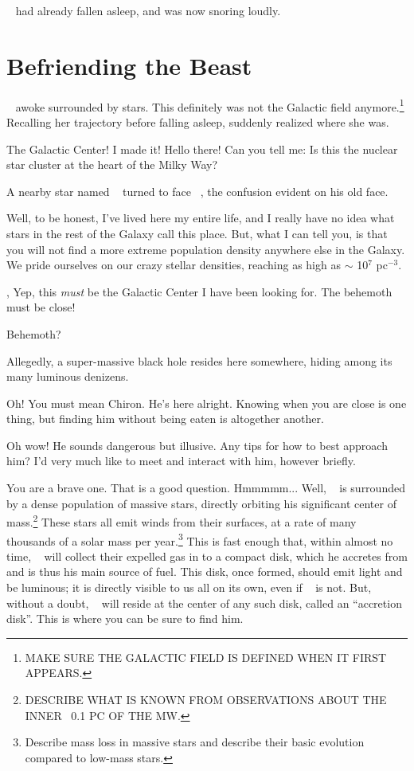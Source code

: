 \documentclass[main.tex]{subfiles}
\begin{document}
\newpara \rmelectra~ had already fallen asleep, and was now snoring loudly.

\section{Befriending the Beast} \label{beast}

\newpara \nar \rmelectra~ awoke surrounded by stars.  This definitely was not the Galactic field anymore.\footnote{MAKE SURE THE GALACTIC FIELD IS DEFINED WHEN IT FIRST APPEARS.}  Recalling her trajectory before falling asleep, \rmelectra suddenly realized where she was.

\newpara \Electra The Galactic Center!  I made it!  Hello there!  Can you tell me:  Is this the nuclear star cluster at the heart of the Milky Way?

\newpara \nar A nearby star named \rmcarystus~ turned to face \rmelectra~, the confusion evident on his old face.  

\newpara \Carystus Well, to be honest, I've lived here my entire life, and I really have no idea what stars in the rest of the Galaxy call this place.  But, what I can tell you, is that you will not find a more extreme population density anywhere else in the Galaxy.  We pride ourselves on our crazy stellar densities, reaching as high as $\sim$ 10$^7$ pc$^{-3}$.

\newpara \Electra, Yep, this \textit{must} be the Galactic Center I have been looking for.  The behemoth must be close!

\newpara \Carystus Behemoth?

\newpara \Electra Allegedly, a super-massive black hole resides here somewhere, hiding among its many luminous denizens.

\newpara \Carystus Oh!  You must mean Chiron.  He's here alright.  Knowing when you are close is one thing, but finding him without being eaten is altogether another. 

\newpara \Electra Oh wow!  He sounds dangerous but illusive.  Any tips for how to best approach him?  I'd very much like to meet and interact with him, however briefly.

\newpara \Carystus  You are a brave one.  That is a good question.  Hmmmmm...   Well, \rmchiron~ is surrounded by a dense population of massive stars, directly orbiting his significant center of mass.\footnote{DESCRIBE WHAT IS KNOWN FROM OBSERVATIONS ABOUT THE INNER ~0.1 PC OF THE MW.}  These stars all emit winds from their surfaces, at a rate of many thousands of a solar mass per year.\footnote{Describe mass loss in massive stars and describe their basic evolution compared to low-mass stars.}  This is fast enough that, within almost no time, \rmchiron~ will collect their expelled gas in to a compact disk, which he accretes from and is thus his main source of fuel.  This disk, once formed, should emit light and be luminous; it is directly visible to us all on its own, even if \rmchiron~ is not.  But, without a doubt, \rmchiron~ will reside at the center of any such disk, called an ``accretion disk''.  This is where you can be sure to find him.
\end{document}
